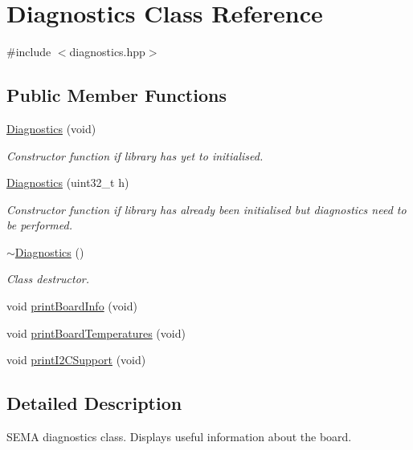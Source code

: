 \hypertarget{class_diagnostics}{}\section{Diagnostics Class Reference}
\label{class_diagnostics}


{\ttfamily \#include $<$diagnostics.\+hpp$>$}

\subsection*{Public Member Functions}
\begin{DoxyCompactItemize}
\item 
\hyperlink{class_diagnostics_a84423ad40c376ce8d8a4f02dc0b7f44c}{Diagnostics} (void)
\begin{DoxyCompactList}\small\item\em Constructor function if library has yet to initialised. \end{DoxyCompactList}\item 
\hyperlink{class_diagnostics_ab4cf66446bf7d4af44315629de9a910b}{Diagnostics} (uint32\+\_\+t h)
\begin{DoxyCompactList}\small\item\em Constructor function if library has already been initialised but diagnostics need to be performed. \end{DoxyCompactList}\item 
\hyperlink{class_diagnostics_ad05cd98138d8ef3a0c1284412fbddd6b}{$\sim$\+Diagnostics} ()
\begin{DoxyCompactList}\small\item\em Class destructor. \end{DoxyCompactList}\item 
void \hyperlink{class_diagnostics_a8263e91e26d536a03442d59e6c5b0d12}{print\+Board\+Info} (void)
\item 
void \hyperlink{class_diagnostics_a686255ad134138a830d0b917334cb264}{print\+Board\+Temperatures} (void)
\item 
void \hyperlink{class_diagnostics_af25cdb55c895228c3d312345e1782c55}{print\+I2\+C\+Support} (void)
\end{DoxyCompactItemize}


\subsection{Detailed Description}
S\+E\+MA diagnostics class. Displays useful information about the board. 

